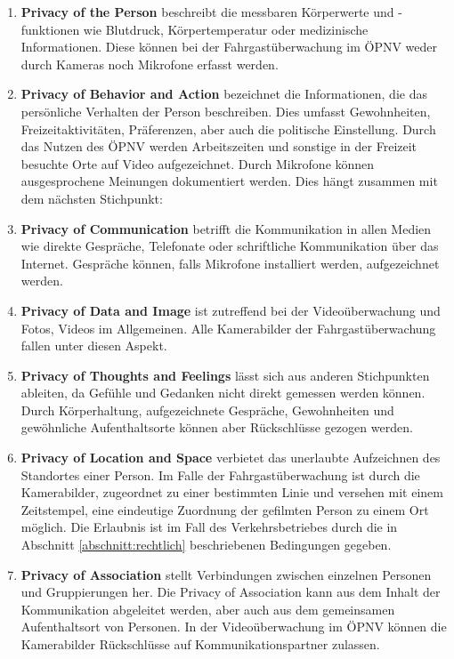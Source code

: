\begin{enumerate}
      \item {\bfseries Privacy of the Person} beschreibt die messbaren Körperwerte und -funk\-tionen wie Blutdruck, Körpertemperatur oder medizinische Informationen. Diese können bei der Fahrgastüberwachung
            im ÖPNV weder durch Kameras noch Mikrofone erfasst werden.
      \item {\bfseries Privacy of Behavior and Action} bezeichnet die Informationen, die das persönliche Verhalten der Person beschreiben. Dies umfasst Gewohnheiten, Freizeitaktivitäten,
            Präferenzen, aber auch die politische Einstellung. Durch das Nutzen des ÖPNV werden Arbeitszeiten und sonstige in der Freizeit besuchte Orte auf Video aufgezeichnet. Durch Mikrofone können
            ausgesprochene Meinungen dokumentiert werden. Dies hängt zusammen mit dem nächsten Stichpunkt:
      \item {\bfseries Privacy of Communication} betrifft die Kommunikation in allen Medien wie direkte Gespräche, Telefonate oder schriftliche Kommunikation über das Internet. Gespräche können, falls Mikrofone installiert werden,
            aufgezeichnet werden.
      \item {\bfseries Privacy of Data and Image} ist zutreffend bei der Videoüberwachung und Fotos, Videos im Allgemeinen. Alle Kamerabilder der Fahrgastüberwachung fallen unter diesen Aspekt.
      \item {\bfseries Privacy of Thoughts and Feelings} lässt sich aus anderen Stichpunkten ableiten, da Gefühle und Gedanken nicht direkt gemessen werden können. Durch Körperhaltung, aufgezeichnete Gespräche,
            Gewohnheiten und gewöhnliche Aufenthaltsorte können aber Rückschlüsse gezogen werden.
      \item {\bfseries Privacy of Location and Space} verbietet das unerlaubte Aufzeichnen des Standortes einer Person. Im Falle der Fahrgastüberwachung ist durch die Kamerabilder, zugeordnet zu
            einer bestimmten Linie und versehen mit einem Zeitstempel, eine eindeutige Zuordnung der gefilmten Person zu einem Ort möglich. Die Erlaubnis ist im Fall des Verkehrsbetriebes durch
            die in Abschnitt \ref{abschnitt:rechtlich} beschriebenen Bedingungen gegeben.
      \item {\bfseries Privacy of Association} stellt Verbindungen zwischen einzelnen Personen und Gruppierungen her. Die \glqq{}Privacy of Association\grqq{} kann aus dem Inhalt der Kommunikation abgeleitet werden,
            aber auch aus dem gemeinsamen Aufenthaltsort von Personen. In der Videoüberwachung im ÖPNV können die Kamerabilder Rückschlüsse auf Kommunikationspartner zulassen.
\end{enumerate}


